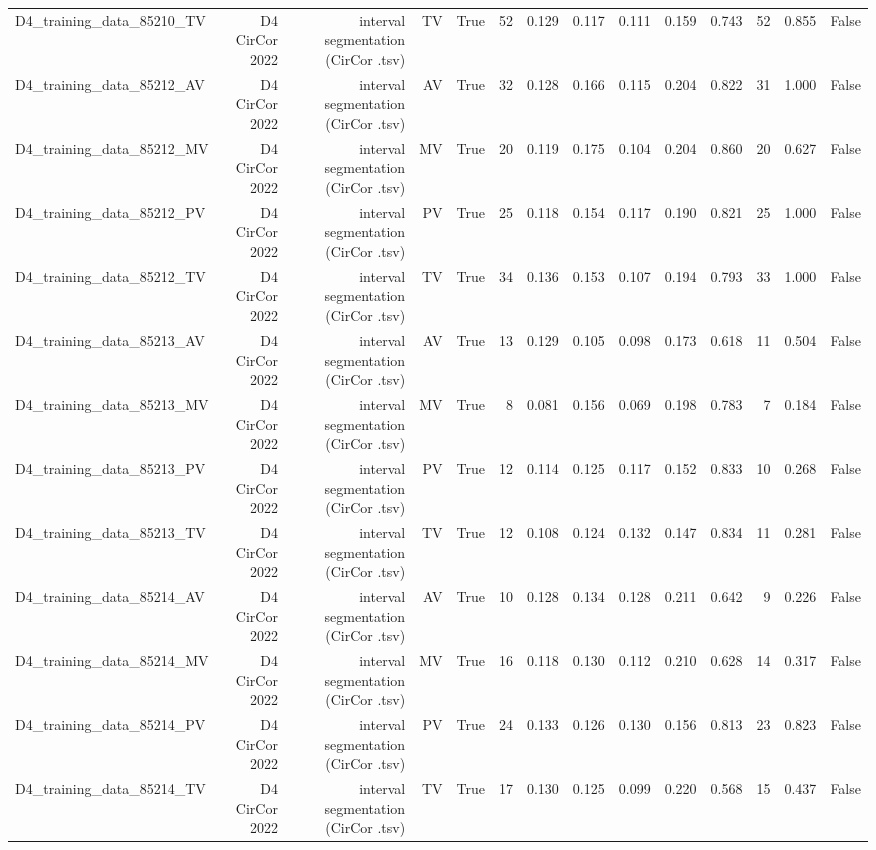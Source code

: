 \begin{table}[htbp]
\begin{tabular}{lrrrrrrrrrrrrr}
    D4\_training\_data\_85210\_TV & D4 CirCor 2022 & interval segmentation (CirCor .tsv) & TV & True & 52 & 0.129 & 0.117 & 0.111 & 0.159 & 0.743 & 52 & 0.855 & False \\
    D4\_training\_data\_85212\_AV & D4 CirCor 2022 & interval segmentation (CirCor .tsv) & AV & True & 32 & 0.128 & 0.166 & 0.115 & 0.204 & 0.822 & 31 & 1.000 & False \\
    D4\_training\_data\_85212\_MV & D4 CirCor 2022 & interval segmentation (CirCor .tsv) & MV & True & 20 & 0.119 & 0.175 & 0.104 & 0.204 & 0.860 & 20 & 0.627 & False \\
    D4\_training\_data\_85212\_PV & D4 CirCor 2022 & interval segmentation (CirCor .tsv) & PV & True & 25 & 0.118 & 0.154 & 0.117 & 0.190 & 0.821 & 25 & 1.000 & False \\
    D4\_training\_data\_85212\_TV & D4 CirCor 2022 & interval segmentation (CirCor .tsv) & TV & True & 34 & 0.136 & 0.153 & 0.107 & 0.194 & 0.793 & 33 & 1.000 & False \\
    D4\_training\_data\_85213\_AV & D4 CirCor 2022 & interval segmentation (CirCor .tsv) & AV & True & 13 & 0.129 & 0.105 & 0.098 & 0.173 & 0.618 & 11 & 0.504 & False \\
    D4\_training\_data\_85213\_MV & D4 CirCor 2022 & interval segmentation (CirCor .tsv) & MV & True & 8 & 0.081 & 0.156 & 0.069 & 0.198 & 0.783 & 7 & 0.184 & False \\
    D4\_training\_data\_85213\_PV & D4 CirCor 2022 & interval segmentation (CirCor .tsv) & PV & True & 12 & 0.114 & 0.125 & 0.117 & 0.152 & 0.833 & 10 & 0.268 & False \\
    D4\_training\_data\_85213\_TV & D4 CirCor 2022 & interval segmentation (CirCor .tsv) & TV & True & 12 & 0.108 & 0.124 & 0.132 & 0.147 & 0.834 & 11 & 0.281 & False \\
    D4\_training\_data\_85214\_AV & D4 CirCor 2022 & interval segmentation (CirCor .tsv) & AV & True & 10 & 0.128 & 0.134 & 0.128 & 0.211 & 0.642 & 9 & 0.226 & False \\
    D4\_training\_data\_85214\_MV & D4 CirCor 2022 & interval segmentation (CirCor .tsv) & MV & True & 16 & 0.118 & 0.130 & 0.112 & 0.210 & 0.628 & 14 & 0.317 & False \\
    D4\_training\_data\_85214\_PV & D4 CirCor 2022 & interval segmentation (CirCor .tsv) & PV & True & 24 & 0.133 & 0.126 & 0.130 & 0.156 & 0.813 & 23 & 0.823 & False \\
    D4\_training\_data\_85214\_TV & D4 CirCor 2022 & interval segmentation (CirCor .tsv) & TV & True & 17 & 0.130 & 0.125 & 0.099 & 0.220 & 0.568 & 15 & 0.437 & False \\

\end{tabular}
\end{table}
